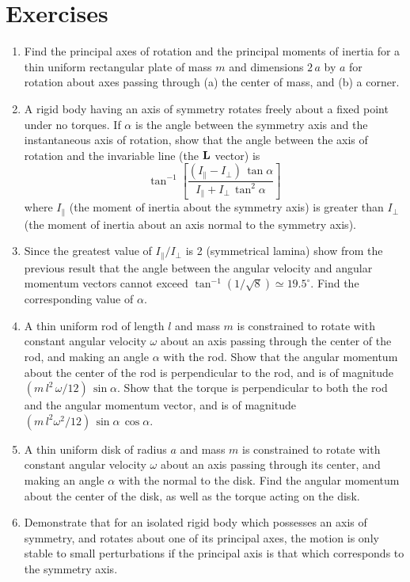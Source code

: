 \section{Exercises}
{\small
\renewcommand{\theenumi}{8.\arabic{enumi}}
\begin{enumerate}
\item Find the principal axes of rotation and the principal moments of inertia for a
thin uniform rectangular plate of mass $m$ and dimensions $2\,a$ by $a$ for rotation
about  axes passing through (a) the center of mass, and (b) a corner.

\item A rigid body having an axis of symmetry rotates freely about a fixed point under no
torques. If $\alpha$ is the angle between the symmetry axis and the instantaneous axis of
rotation, show that the angle between the axis of rotation and the invariable line
(the ${\bf L}$ vector) is
$$
\tan^{-1}\left[\frac{(I_\parallel-I_\perp)\,\tan\alpha}{I_\parallel+I_\perp\,\tan^2\alpha}\right]
$$
where $I_\parallel$ (the moment of inertia about the symmetry axis) is greater than $I_\perp$
(the moment of inertia about an axis normal to the symmetry axis).

\item Since the greatest value of $I_\parallel/I_\perp$ is 2 (symmetrical lamina) show
from the previous result that the angle between the angular velocity and angular momentum
vectors cannot exceed $\tan^{-1}(1/\sqrt{8})\simeq19.5^\circ$. Find the corresponding
value of $\alpha$. 

\item A thin uniform rod of length $l$ and mass $m$ is constrained to rotate
with constant angular velocity $\omega$ about an axis passing through the
center of the rod, and making an angle $\alpha$ with the rod.
Show that the angular momentum about the center of the rod is perpendicular to the rod, and is of magnitude $(m\,l^2\,\omega/12)\,\sin\alpha$. Show that
the torque is perpendicular to both the rod and the angular momentum vector,
and is of magnitude $(m\,l^2\omega^2/12)\,\sin\alpha\,\cos\alpha$. 

\item A thin uniform disk of radius $a$ and mass $m$ is constrained to rotate
with constant angular velocity $\omega$ about an axis passing through its center, and making an angle $\alpha$ with the normal to the disk.
Find the angular momentum about the center of the disk, as
well as the torque acting on the disk. 

\item Demonstrate that for an isolated rigid body which possesses an
axis of symmetry, and rotates about one of its principal axes, the motion is
only stable to small perturbations if the principal axis is that which corresponds to the
symmetry axis. 

\end{enumerate}

}
